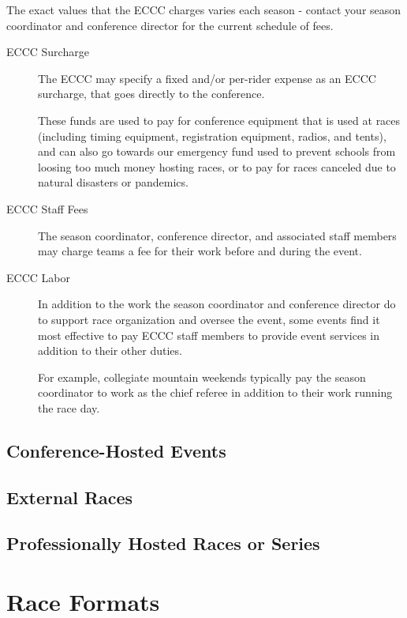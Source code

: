 \documentclass[
  letterpaper, %
  fontsize=10pt, %
  twoside=true,
  chapterentrydots=true, %
  numbers=noenddot,
  fontmethod=tex,
]{kaobook}
\begin{document}
The exact values that the ECCC charges varies each season - contact your season coordinator and conference director for the current schedule of fees.

\begin{description}
  \item[ECCC Surcharge]
      The ECCC may specify a fixed and/or per-rider expense as an ECCC surcharge, that goes directly to the conference.

      These funds are used to pay for conference equipment that is used at races (including timing equipment, registration equipment, radios, and tents),
      and can also go towards our emergency fund used to prevent schools from loosing too much money hosting races, or to pay for races canceled due to natural disasters or pandemics.
  \item[ECCC Staff Fees]
      The season coordinator, conference director, and associated staff members may charge teams a fee for their work before and during the event.
  \item[ECCC Labor]
      In addition to the work the season coordinator and conference director do to support race organization and oversee the event,
      some events find it most effective to pay ECCC staff members to provide event services in addition to their other duties.

      For example, collegiate mountain weekends typically pay the season coordinator to work as the chief referee in addition to their work running the race day.
\end{description}

\section{Conference-Hosted Events}

\section{External Races}

\section[Professionally Hosted]{Professionally Hosted Races or Series}

\setchapterpreamble[u]{\margintoc}
\chapter{Race Formats}
\end{document}

